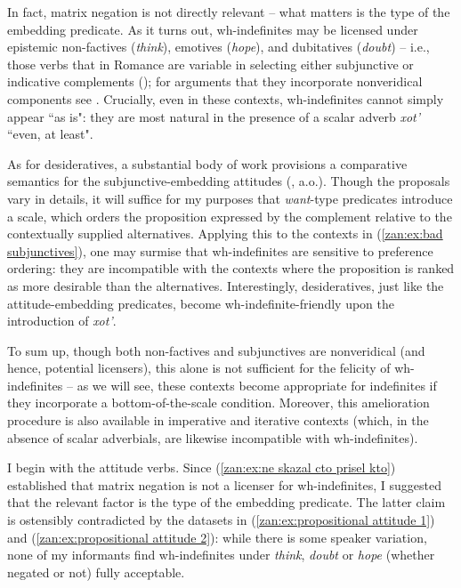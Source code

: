 \documentclass[output=paper,colorlinks,citecolor=brown]{langscibook}
\begin{document}
\z

\noindent In fact, matrix negation is not directly relevant -- what matters is the type of the embedding predicate. As it turns out, wh-indefinites may be licensed under epistemic non-factives (\textit{think}), emotives (\textit{hope}), and dubitatives (\textit{doubt}) -- i.e., those verbs that in Romance are variable in selecting either subjunctive or indicative complements (\citealt{AnandPranav2013Eaa, farkas1992semantics}); for arguments that they incorporate nonveridical components see \citet{giannakidou2016emotive}. Crucially, even in these contexts, wh-indefinites cannot simply appear ``as is": they are most natural in the presence of a scalar adverb \textit{xot'} ``even, at least". 
 
As for desideratives, a substantial body of work provisions a comparative semantics for the subjunctive-embedding attitudes (\citealt{AnandPranav2013Eaa, heim1992presupposition, villalta2000spanish, villalta2008mood}, a.o.). Though the proposals vary in details, it will suffice for my purposes that \textit{want}-type predicates introduce a scale, which orders the proposition expressed by the complement relative to the contextually supplied alternatives. Applying this to the contexts in (\ref{zan:ex:bad subjunctives}), one may surmise that wh-indefinites are sensitive to preference ordering: they are incompatible with the contexts where the proposition is ranked as more desirable than the alternatives. Interestingly, desideratives, just like the attitude-embedding predicates, become wh-indefinite-friendly upon the introduction of  \textit{xot'}.    
 
To sum up, though both non-factives and subjunctives are nonveridical (and hence, potential licensers), this alone is not sufficient for the felicity of wh-indefi\-nites -- as we will see, these contexts become appropriate for indefinites if they incorporate a bottom-of-the-scale condition. Moreover, this amelioration procedure is also available in imperative and iterative contexts (which, in the absence of scalar adverbials, are likewise incompatible with wh-indefinites).

I begin with the attitude verbs. Since (\ref{zan:ex:ne skazal cto prisel kto}) established that matrix negation is not a licenser for wh-indefinites, I suggested that the relevant factor is the type of the embedding predicate. The latter claim is ostensibly contradicted by the datasets in (\ref{zan:ex:propositional attitude 1}) and (\ref{zan:ex:propositional attitude 2}): while there is some speaker variation, none of my informants find wh-indefinites under \textit{think}, \textit{doubt} or \textit{hope} (whether negated or not) fully acceptable. 
\end{document}

